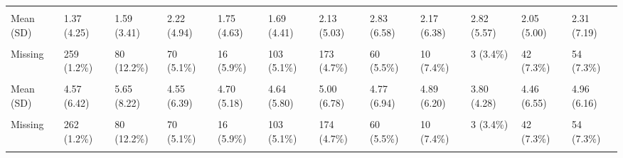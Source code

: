 \documentclass[
  single column]{article}
\begin{document}
\begin{landscape}
\begin{longtable}[t]{llllllllllll}
\cellcolor{gray!10}{Hours Spent on Charity per Week} & \cellcolor{gray!10}{} & \cellcolor{gray!10}{} & \cellcolor{gray!10}{} & \cellcolor{gray!10}{} & \cellcolor{gray!10}{} & \cellcolor{gray!10}{} & \cellcolor{gray!10}{} & \cellcolor{gray!10}{} & \cellcolor{gray!10}{} & \cellcolor{gray!10}{} & \cellcolor{gray!10}{}\\
Mean (SD) & 1.37 (4.25) & 1.59 (3.41) & 2.22 (4.94) & 1.75 (4.63) & 1.69 (4.41) & 2.13 (5.03) & 2.83 (6.58) & 2.17 (6.38) & 2.82 (5.57) & 2.05 (5.00) & 2.31 (7.19)\\
\cellcolor{gray!10}{Median [Min, Max]} & \cellcolor{gray!10}{0 [0, 100]} & \cellcolor{gray!10}{0 [0, 25.0]} & \cellcolor{gray!10}{0 [0, 60.0]} & \cellcolor{gray!10}{0 [0, 45.0]} & \cellcolor{gray!10}{0 [0, 50.0]} & \cellcolor{gray!10}{0 [0, 100]} & \cellcolor{gray!10}{0 [0, 100]} & \cellcolor{gray!10}{0 [0, 56.0]} & \cellcolor{gray!10}{0 [0, 30.0]} & \cellcolor{gray!10}{0 [0, 52.0]} & \cellcolor{gray!10}{0 [0, 100]}\\
\addlinespace
Missing & 259 (1.2\%) & 80 (12.2\%) & 70 (5.1\%) & 16 (5.9\%) & 103 (5.1\%) & 173 (4.7\%) & 60 (5.5\%) & 10 (7.4\%) & 3 (3.4\%) & 42 (7.3\%) & 54 (7.3\%)\\
\cellcolor{gray!10}{Commute Hours per Week} & \cellcolor{gray!10}{} & \cellcolor{gray!10}{} & \cellcolor{gray!10}{} & \cellcolor{gray!10}{} & \cellcolor{gray!10}{} & \cellcolor{gray!10}{} & \cellcolor{gray!10}{} & \cellcolor{gray!10}{} & \cellcolor{gray!10}{} & \cellcolor{gray!10}{} & \cellcolor{gray!10}{}\\
Mean (SD) & 4.57 (6.42) & 5.65 (8.22) & 4.55 (6.39) & 4.70 (5.18) & 4.64 (5.80) & 5.00 (6.78) & 4.77 (6.94) & 4.89 (6.20) & 3.80 (4.28) & 4.46 (6.55) & 4.96 (6.16)\\
\cellcolor{gray!10}{Median [Min, Max]} & \cellcolor{gray!10}{3.00 [0, 160]} & \cellcolor{gray!10}{3.50 [0, 100]} & \cellcolor{gray!10}{3.00 [0, 100]} & \cellcolor{gray!10}{3.00 [0, 40.0]} & \cellcolor{gray!10}{3.00 [0, 100]} & \cellcolor{gray!10}{3.50 [0, 100]} & \cellcolor{gray!10}{3.00 [0, 100]} & \cellcolor{gray!10}{3.75 [0, 50.0]} & \cellcolor{gray!10}{3.00 [0, 25.0]} & \cellcolor{gray!10}{3.00 [0, 80.0]} & \cellcolor{gray!10}{3.00 [0, 60.0]}\\
Missing & 262 (1.2\%) & 80 (12.2\%) & 70 (5.1\%) & 16 (5.9\%) & 103 (5.1\%) & 174 (4.7\%) & 60 (5.5\%) & 10 (7.4\%) & 3 (3.4\%) & 42 (7.3\%) & 54 (7.3\%)\\
\addlinespace
\cellcolor{gray!10}{Hours Exercising per Week} & \cellcolor{gray!10}{} & \cellcolor{gray!10}{} & \cellcolor{gray!10}{} & \cellcolor{gray!10}{} & \cellcolor{gray!10}{} & \cellcolor{gray!10}{} & \cellcolor{gray!10}{} & \cellcolor{gray!10}{} & \cellcolor{gray!10}{} & \cellcolor{gray!10}{} & \cellcolor{gray!10}{}\\

\end{longtable}
\end{landscape}
\end{document}
